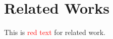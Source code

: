 \documentclass[../main.tex]{subfiles}
\begin{document}
\chapter{Related Works}
\label{chap:related}

This is \textcolor{red}{red text} for related work.
\end{document}
